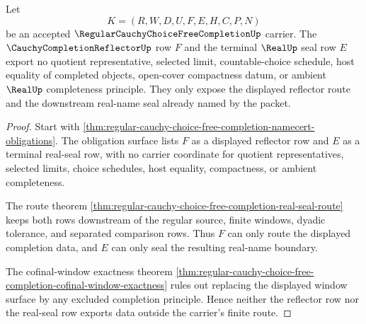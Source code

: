 \begin{theorem}
\label{thm:regular-cauchy-choice-free-completion-reflector-nonescape}
Let
$$
K=(R,W,D,U,F,E,H,C,P,N)
$$
be an accepted $\RegularCauchyChoiceFreeCompletionUp$ carrier. The $\CauchyCompletionReflectorUp$ row $F$ and the terminal $\RealUp$ seal row $E$ export no quotient representative, selected limit, countable-choice schedule, host equality of completed objects, open-cover compactness datum, or ambient $\RealUp$ completeness principle. They only expose the displayed reflector route and the downstream real-name seal already named by the packet.
\end{theorem}
\begin{proof}
Start with \autoref{thm:regular-cauchy-choice-free-completion-namecert-obligations}. The obligation surface lists $F$ as a displayed reflector row and $E$ as a terminal real-seal row, with no carrier coordinate for quotient representatives, selected limits, choice schedules, host equality, compactness, or ambient completeness.

The route theorem \autoref{thm:regular-cauchy-choice-free-completion-real-seal-route} keeps both rows downstream of the regular source, finite windows, dyadic tolerance, and separated comparison rows. Thus $F$ can only route the displayed completion data, and $E$ can only seal the resulting real-name boundary.

The cofinal-window exactness theorem \autoref{thm:regular-cauchy-choice-free-completion-cofinal-window-exactness} rules out replacing the displayed window surface by any excluded completion principle. Hence neither the reflector row nor the real-seal row exports data outside the carrier's finite route.
\end{proof}

